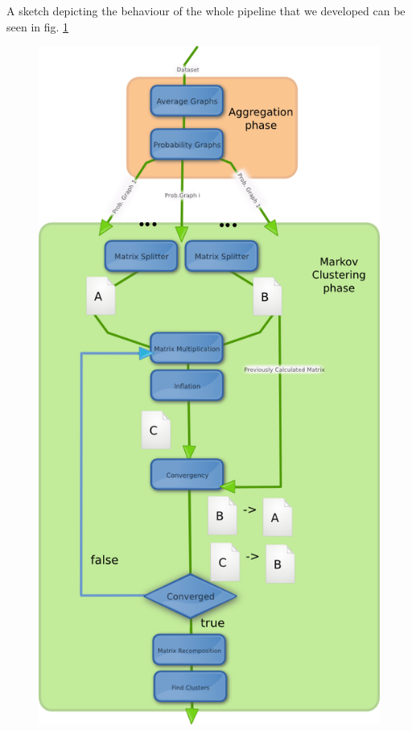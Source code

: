 A sketch depicting the behaviour of the whole pipeline that we developed can be seen in fig. \ref{fig:completepipeline}
\newpage
\begin{figure}
\centering
\includegraphics[scale=0.7]{completepipeline.png}
\label{fig:completepipeline}
\end{figure}
\newpage

